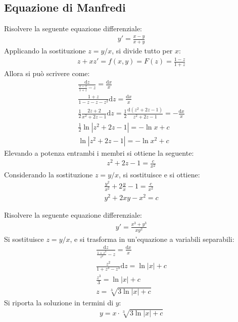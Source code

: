 \documentclass{article}
\newcommand{\df}{\mathrm{d}}
\numberwithin{equation}{subsection}
\begin{document}
\subsection{Equazione di Manfredi}


Risolvere la seguente equazione differenziale:
\begin{gather*}
    y'=\displaystyle\frac{x-y}{x+y}
\end{gather*}
Applicando la sostituzione $z=y/x$, si divide tutto per $x$:
\begin{gather*}
    z+xz'=f(x,y)=F(z)=\displaystyle\frac{1-z}{1+z}
\end{gather*}
Allora si può scrivere come:
\begin{gather*}
    \displaystyle\frac{\df z}{\frac{1-z}{1+z}-z}=\frac{\df x}{x}\\
    \displaystyle\frac{1+z}{1-z-z-z^2}\df z=\frac{\df x}{x}\\
    \displaystyle\frac{1}{2}\frac{2z+2}{x^2+2z-1}\df z=\frac{1}{2}\frac{\df(z^2+2z-1)}{z^2+2z-1}=-\frac{\df x}{x}\\
    \displaystyle\frac{1}{2}\ln|z^2+2z-1|=-\ln x+c\\
    \displaystyle\ln|z^2+2z-1|=-\ln x^2+c
\end{gather*}
Elevando a potenza entrambi i membri si ottiene la seguente:
\begin{gather*}
    z^2+2z-1=\frac{c}{x^2}
\end{gather*}
Considerando la sostituzione $z=y/x$, si sostituisce e si ottiene:
\begin{gather*}
    \displaystyle\frac{y^2}{x^2}+2\frac{y}{x}-1=\frac{c}{x^2}\\
    y^2+2xy-x^2=c
\end{gather*}



Risolvere la seguente equazione differenziale:
\begin{gather*}
    y'=\displaystyle\frac{x^3+y^3}{xy^2}
\end{gather*}
Si sostituisce $z=y/x$, e si trasforma in un'equazione a variabili separabili:
\begin{gather*}
    \frac{\df z}{\frac{1+z^3}{z^2}-z}=\frac{\df x}{x}\\
    \frac{z^2}{1+z^3-z^3}\df z=\ln|x|+c\\
    \frac{z^3}{3}=\ln|x|+c\\
    z=\sqrt[3]{3\ln|x|+c}
\end{gather*}
Si riporta la soluzione in termini di $y$:
\begin{gather*}
    y=x\cdot\sqrt[3]{3\ln|x|+c}
\end{gather*}
\end{document}
